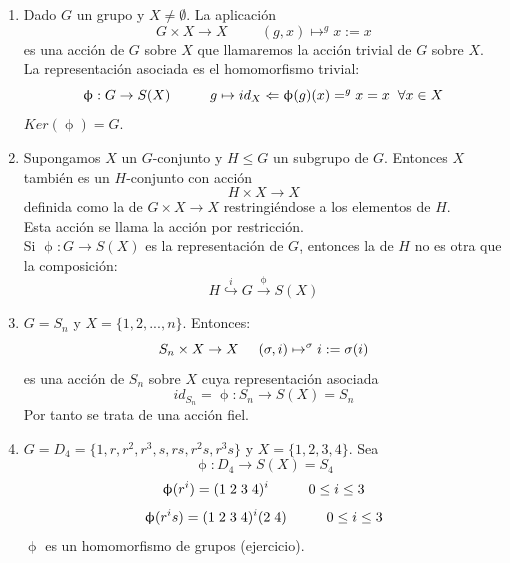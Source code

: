 \documentclass[11pt,a4paper]{article}
\begin{document}
\begin{enumerate}[label = \arabic*)]
\item Dado $G$ un grupo y $X \neq \emptyset$. La aplicación
$$G \times X \to X \hspace{1cm} (g,x) \mapsto ^{g}x := x$$
es una acción de $G$ sobre $X$ que llamaremos la acción trivial de $G$ sobre $X$. \\
La representación asociada es el homomorfismo trivial:
$$\upphi: G \to S(X) \hspace{1cm} g \mapsto id_{X} \Leftarrow \upphi(g)(x) = ^{g}x = x \hspace{0.2cm} \forall x \in X$$
$Ker(\upphi) = G$.
\item Supongamos $X$ un $G$-conjunto y $H \leqslant G$ un subgrupo de $G$. Entonces $X$ también es un $H$-conjunto con acción
$$H \times X \to X$$
definida como la de $G \times X \to X$ restringiéndose a los elementos de $H$. \\
Esta acción se llama la acción por restricción. \\
Si $\upphi: G \to S(X)$ es la representación de $G$, entonces la de $H$ no es otra que la composición:
$$H \overset{i}{\hookrightarrow} G \overset{\upphi}{\to} S(X)$$
\item $G = S_{n}$ y $X = \{1,2,...,n\}$. Entonces:
$$S_{n} \times X \to X \hspace{0.5cm} (\sigma, i) \mapsto ^{\sigma}i := \sigma(i)$$
es una acción de $S_{n}$ sobre $X$ cuya representación asociada
$$id_{S_{n}} = \upphi: S_{n} \to S(X) = S_{n}$$
Por tanto se trata de una acción fiel.
\item $G = D_{4} = \{1, r, r^{2}, r^{3}, s, rs, r^{2}s, r^{3}s\}$ y $X = \{1, 2, 3, 4\}$. Sea
$$\upphi: D_{4} \to S(X) = S_{4}$$
$$\upphi(r^{i}) = (1 \hspace{0.1cm} 2 \hspace{0.1cm} 3 \hspace{0.1cm} 4)^{i} \hspace{1cm} 0 \leq i \leq 3$$
$$\upphi(r^{i}s) = (1 \hspace{0.1cm} 2 \hspace{0.1cm} 3 \hspace{0.1cm} 4)^{i} (2 \hspace{0.1cm} 4) \hspace{1cm} 0 \leq i \leq 3$$
$\upphi$ es un homomorfismo de grupos (ejercicio).


\end{enumerate}
\end{document}
